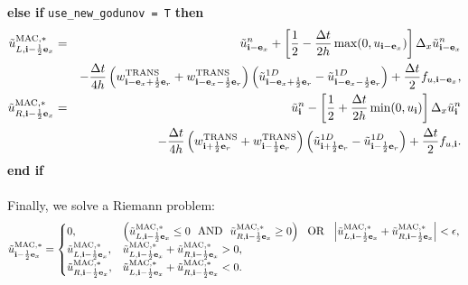 {\bf else if} {\tt use\_new\_godunov = T} {\bf then}
\begin{eqnarray}
\tilde{u}_{L,{\bf i}-\frac{1}{2}{\bf e}_x}^{\rm MAC,*} &=& \tilde{u}_{{\bf i}-{\bf e}_x}^n + \left[\frac{1}{2} - \frac{\Delta t}{2h}\max(0,u_{{\bf i}-{\bf e}_x})\right]\Delta_x \tilde{u}_{{\bf i}-{\bf e}_x}^n \nonumber \\
&& -\frac{\Delta t}{4h}\left(w_{{\bf i}-{\bf e}_x+\frac{1}{2}{\bf e}_r}^{\rm TRANS}+w_{{\bf i}-{\bf e}_x-\frac{1}{2}{\bf e}_r}^{\rm TRANS}\right)\left(\tilde{u}_{{\bf i}-{\bf e}_x+\frac{1}{2}{\bf e}_r}^{1D} - \tilde{u}_{{\bf i}-{\bf e}_x-\frac{1}{2}{\bf e}_r}^{1D}\right) + \frac{\Delta t}{2}f_{u,{\bf i}-{\bf e}_x}, \\
\tilde{u}_{R,{\bf i}-\frac{1}{2}{\bf e}_x}^{\rm MAC,*} &=& \tilde{u}_{{\bf i}}^n - \left[\frac{1}{2} + \frac{\Delta t}{2h}\min(0,u_{{\bf i}})\right]\Delta_x \tilde{u}_{{\bf i}}^n \nonumber \\
&& -\frac{\Delta t}{4h}\left(w_{{\bf i}+\frac{1}{2}{\bf e}_r}^{\rm TRANS}+w_{{\bf i}-\frac{1}{2}{\bf e}_r}^{\rm TRANS}\right)\left(\tilde{u}_{{\bf i}+\frac{1}{2}{\bf e}_r}^{1D} - \tilde{u}_{{\bf i}-\frac{1}{2}{\bf e}_r}^{1D}\right) + \frac{\Delta t}{2}f_{u,{\bf i}}.
\end{eqnarray}
{\bf end if}\\ \\
Finally, we solve a Riemann problem:
\begin{equation}
\tilde{u}_{{\bf i}-\frac{1}{2}{\bf e}_x}^{\rm MAC,*} =
\begin{cases}
0, & \left(\tilde{u}_{L,{\bf i}-\frac{1}{2}{\bf e}_x}^{\rm MAC,*} \le 0 ~~ {\rm AND} ~~ \tilde{u}_{R,{\bf i}-\frac{1}{2}{\bf e}_x}^{\rm MAC,*} \ge 0\right) ~~ {\rm OR} ~~ \left|\tilde{u}_{L,{\bf i}-\frac{1}{2}{\bf e}_x}^{\rm MAC,*} + \tilde{u}_{R,{\bf i}-\frac{1}{2}{\bf e}_x}^{\rm MAC,*}\right| < \epsilon, \\
\tilde{u}_{L,{\bf i}-\frac{1}{2}{\bf e}_x}^{\rm MAC,*}, & \tilde{u}_{L,{\bf i}-\frac{1}{2}{\bf e}_x}^{\rm MAC,*} + \tilde{u}_{R,{\bf i}-\frac{1}{2}{\bf e}_x}^{\rm MAC,*} > 0, \\
\tilde{u}_{R,{\bf i}-\frac{1}{2}{\bf e}_x}^{\rm MAC,*}, & \tilde{u}_{L,{\bf i}-\frac{1}{2}{\bf e}_x}^{\rm MAC,*} + \tilde{u}_{R,{\bf i}-\frac{1}{2}{\bf e}_x}^{\rm MAC,*} < 0. 
\end{cases}
\end{equation}

